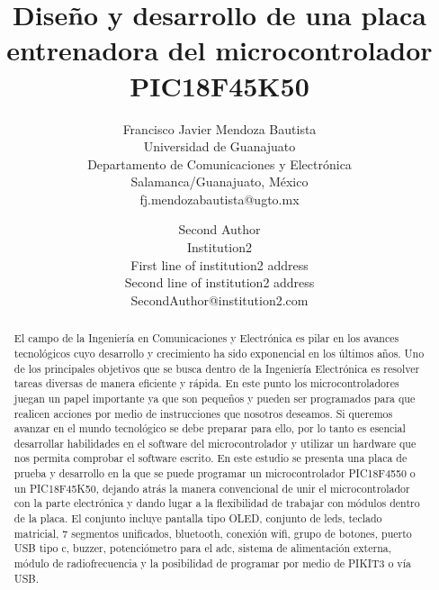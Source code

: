 \documentclass[times, 10pt,twocolumn]{article}
\begin{document}
\title{Diseño y desarrollo de una placa entrenadora del microcontrolador PIC18F45K50}

\author{Francisco Javier Mendoza Bautista\\
Universidad de Guanajuato\\ Departamento de Comunicaciones y Electrónica \\  
Salamanca/Guanajuato, México\\fj.mendozabautista@ugto.mx\\
\and
Second Author\\
Institution2\\
First line of institution2 address\\ Second line of institution2 address\\ 
SecondAuthor@institution2.com\\
}

\maketitle
\thispagestyle{empty}

\begin{abstract}
  El campo de la Ingeniería en Comunicaciones y Electrónica es pilar en los avances tecnológicos cuyo desarrollo y crecimiento ha sido exponencial en los últimos años. Uno de los principales objetivos que se busca dentro de la Ingeniería Electrónica es resolver tareas diversas de manera eficiente y rápida.
 En este punto los  microcontroladores juegan un papel importante ya que son pequeños y pueden ser programados para que realicen  acciones por  medio de instrucciones que nosotros deseamos. 
Si queremos avanzar en el mundo tecnológico se debe preparar para ello, por lo tanto es esencial desarrollar habilidades en el  software del microcontrolador y utilizar un hardware que nos permita comprobar el software escrito. En este estudio se presenta una placa de prueba y desarrollo en la que se puede programar un microcontrolador PIC18F4550 o un PIC18F45K50, dejando atrás la manera convencional de unir el microcontrolador con la parte electrónica y dando lugar a la flexibilidad de trabajar con módulos dentro de la placa. El conjunto incluye pantalla tipo OLED, conjunto de leds, teclado matricial, 7 segmentos unificados, bluetooth, conexión wifi, grupo de botones, puerto USB tipo c, buzzer, potenciómetro para el adc, sistema de alimentación externa, módulo de radiofrecuencia y la posibilidad de programar por medio de PIKIT3 o vía USB.
\end{abstract}
\end{document}
